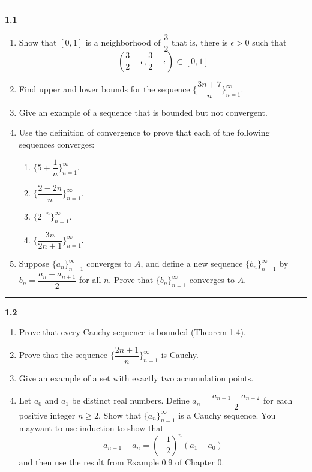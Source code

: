\documentclass[fleqn]{article}
\begin{document}
  \rule{15cm}{2pt}

  \textbf{1.1}
  \begin{enumerate}
    \item Show that $[0, 1]$ is a neighborhood of $\dfrac{3}{2}$ that is, there is $\epsilon > 0$ such that
    $$
      \left(\dfrac{3}{2}-\epsilon, \dfrac{3}{2}+\epsilon\right) \subset [0,1]
    $$

    \item Find upper and lower bounds for the sequence $\{ \dfrac{3n+7}{n}\}_{n=1}^{\infty}$.

    \item Give an example of a sequence that is bounded but not convergent.

    \item Use the definition of convergence to prove that each of the following sequences converges:
    \begin{enumerate}
      \item $\{5+\dfrac{1}{n}\}_{n=1}^{\infty}$.
      
      \item $\{\dfrac{2-2n}{n}\}_{n=1}^{\infty}$.

      \item $\{2^{-n}\}_{n=1}^{\infty}$.

      \item $\{\dfrac{3n}{2n+1}\}_{n=1}^{\infty}$.
    \end{enumerate}

    \item Suppose $\{a_n\}_{n=1}^{\infty}$ converges to $A$, and define a new sequence $\{b_n\}_{n=1}^{\infty}$ by
    $b_n=\dfrac{a_n+a_{n+1}}{2}$ for all $n$. Prove that $\{b_n\}_{n=1}^{\infty}$ converges to $A$.
  \end{enumerate}

  \rule{15cm}{2pt}

  \textbf{1.2}
  \begin{enumerate}
    \item Prove that every Cauchy sequence is bounded (Theorem 1.4).

    \item Prove that the sequence $\{\dfrac{2n+1}{n}\}_{n=1}^{\infty}$ is Cauchy.

    \item Give an example of a set with exactly two accumulation points.

    \item Let $a_0$ and $a_1$ be distinct real numbers. Define $a_n=\dfrac{a_{n-1}+a_{n-2}}{2}$ for each positive integer
    $n \geqslant 2$. Show that $\{a_n\}_{n=1}^{\infty}$ is a Cauchy sequence. You maywant to use induction to show that
    $$
      a_{n+1}-a_n=\left(-\dfrac{1}{2}\right)^n \left(a_1-a_0\right)
    $$
    and then use the result from Example 0.9 of Chapter 0.
  \end{enumerate}
\end{document}
